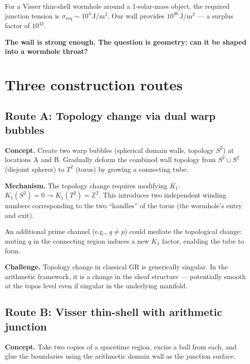 \documentclass[11pt,a4paper]{article}
\begin{document}
For a Visser thin-shell wormhole around a 1-solar-mass object,
the required junction tension is $\sigma_{\mathrm{req}} \sim 10^4\,\mathrm{J/m^2}$.
Our wall provides $10^{46}\,\mathrm{J/m^2}$ --- a surplus
factor of $10^{42}$.

\textbf{The wall is strong enough. The question is geometry:
can it be shaped into a wormhole throat?}

\section{Three construction routes}
\label{sec:routes}

\subsection{Route A: Topology change via dual warp bubbles}

\textbf{Concept.} Create two warp bubbles (spherical domain walls,
topology $S^2$) at locations A and B. Gradually deform the
combined wall topology from $S^2 \sqcup S^2$ (disjoint spheres)
to $T^2$ (torus) by growing a connecting tube.

\textbf{Mechanism.} The topology change requires modifying $K_1$:
$K_1(S^2) = 0 \to K_1(T^2) = \mathbb{Z}^2$. This introduces
two independent winding numbers corresponding to the two
``handles'' of the torus (the wormhole's entry and exit).

An additional prime channel (e.g., $q \neq p$) could mediate
the topological change: muting $q$ in the connecting region
induces a new $K_1$ factor, enabling the tube to form.

\textbf{Challenge.} Topology change in classical GR is generically
singular. In the arithmetic framework, it is a change in the
sheaf structure --- potentially smooth at the topos level even
if singular in the underlying manifold.

\subsection{Route B: Visser thin-shell with arithmetic junction}

\textbf{Concept.} Take two copies of a spacetime region, excise
a ball from each, and glue the boundaries using the arithmetic
domain wall as the junction surface.
\end{document}
